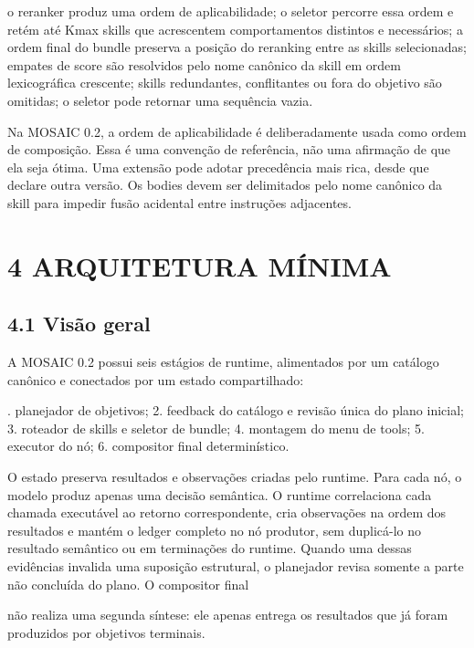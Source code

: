 \documentclass[12pt,a4paper]{article}
\begin{document}
\noindent \textbullet{} o reranker produz uma ordem de aplicabilidade; \textbullet{} o seletor percorre essa ordem e retém até Kmax skills que acrescentem comportamentos distintos e necessários; \textbullet{} a ordem final do bundle preserva a posição do reranking entre as skills selecionadas; \textbullet{} empates de score são resolvidos pelo nome canônico da skill em ordem lexicográfica crescente; \textbullet{} skills redundantes, conflitantes ou fora do objetivo são omitidas; \textbullet{} o seletor pode retornar uma sequência vazia.\par

Na MOSAIC 0.2, a ordem de aplicabilidade é deliberadamente usada como ordem de composição. Essa é uma convenção de referência, não uma afirmação de que ela seja ótima. Uma extensão pode adotar precedência mais rica, desde que declare outra versão. Os bodies devem ser delimitados pelo nome canônico da skill para impedir fusão acidental entre instruções adjacentes.


\section*{4 ARQUITETURA MÍNIMA}

\subsection*{4.1 Visão geral}

A MOSAIC 0.2 possui seis estágios de runtime, alimentados por um catálogo canônico e conectados por um estado compartilhado:


. planejador de objetivos; 2. feedback do catálogo e revisão única do plano inicial; 3. roteador de skills e seletor de bundle; 4. montagem do menu de tools; 5. executor do nó; 6. compositor final determinístico.\par

O estado preserva resultados e observações criadas pelo runtime. Para cada nó, o modelo produz apenas uma decisão semântica. O runtime correlaciona cada chamada executável ao retorno correspondente, cria observações na ordem dos resultados e mantém o ledger completo no nó produtor, sem duplicá-lo no resultado semântico ou em terminações do runtime. Quando uma dessas evidências invalida uma suposição estrutural, o planejador revisa somente a parte não concluída do plano. O compositor final



não realiza uma segunda síntese: ele apenas entrega os resultados que já foram produzidos por objetivos terminais.
\end{document}

